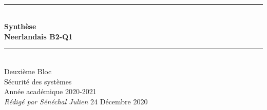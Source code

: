 \documentclass[a4paper]{article}
\newcommand{\HRule}{\rule{\linewidth}{0.5mm}}
\newcommand{\bgimg}[1]{
\AddToShipoutPicture
   {
      \put(\LenToUnit{0 cm},\LenToUnit{0 cm})
      {
            \texttt{[image: \#1]} 
      }
   }
}
\begin{document}





  \begin{titlepage}
    \begin{sffamily}
    \begin{center}
      \textnormal{}\\[6.5cm]
      \HRule \\[0.4cm]
      { \Huge \bfseries Synthèse\\ Neerlandais B2-Q1\\ [0.4cm] }
      \HRule \\[3cm]
      \Large
      Deuxième Bloc\\
      Sécurité des systèmes\\
      Année académique 2020-2021\\[0.2cm]
      \emph{Rédigé par Sénéchal Julien}
      \vfill
      {\large 24 Décembre 2020}
    \end{center}
    \end{sffamily}
  \end{titlepage}
\end{document}
